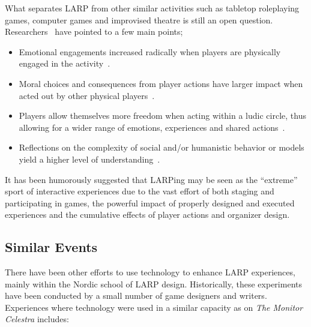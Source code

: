 What separates LARP from other similar activities such as tabletop
roleplaying games, computer games and improvised theatre is still an
open question. Researchers~\cite{montola2012,turku3,henriksen2004}
have pointed to a few main points; 

\begin{itemize}
\item Emotional engagements increased radically when players are physically engaged in the activity~\cite{turku3}.
\item Moral choices and consequences from player actions have larger impact when acted out by other physical players~\cite{turku3}.
\item Players allow themselves more freedom when acting within a ludic circle, thus allowing for a wider range of emotions, experiences and shared actions~\cite{montola2012,stenros2012}.
\item Reflections on the complexity of social and/or humanistic behavior or models yield a higher level of understanding~\cite{henriksen2004}. 
\end{itemize}

It has been humorously suggested that LARPing may be seen as the ``extreme'' sport of interactive experiences due to the vast effort of both staging and participating in games, the powerful impact of properly designed and executed experiences and the cumulative effects of player actions and organizer design. 

\subsection{Similar Events}

There have been other efforts to use technology to enhance LARP experiences, mainly within the Nordic school of LARP design.  Historically, these experiments have been conducted by a small number of game designers and writers. Experiences where technology were used in a similar capacity as on \emph{The Monitor Celestra} includes: 

